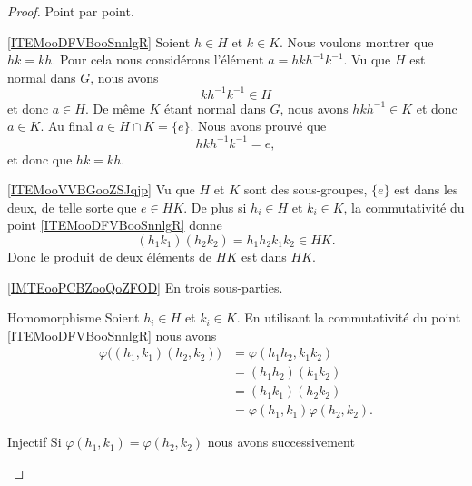 \begin{proof}
    Point par point.
    \begin{subproof}
    \item[\ref{ITEMooDFVBooSnnlgR}]
        Soient \( h\in H\) et \( k\in K\). Nous voulons montrer que \( hk=kh\). Pour cela nous considérons l'élément \( a=hkh^{-1}k^{-1}\). Vu que \( H \) est normal dans \( G\), nous avons 
        \begin{equation}
            kh^{-1}k^{-1}\in H
        \end{equation}
        et donc \( a\in H\). De même \( K\) étant normal dans \( G\), nous avons \( hkh^{-1}\in K\) et donc \( a\in K\). Au final \( a\in H\cap K=\{ e \}\). Nous avons prouvé que
        \begin{equation}
            hkh^{-1}k^{-1}=e,
        \end{equation}
        et donc que \( hk=kh\).
    \item[\ref{ITEMooVVBGooZSJqjp}]
        Vu que \( H\) et \( K\) sont des sous-groupes, \( \{ e \}\) est dans les deux, de telle sorte que \( e\in HK\). De plus si \( h_i\in H\) et \( k_i\in K\), la commutativité du point \ref{ITEMooDFVBooSnnlgR} donne
        \begin{equation}
            (h_1k_1)(h_2k_2)=h_1h_2k_1k_2\in HK.
        \end{equation}
        Donc le produit de deux éléments de \( HK\) est dans $HK$.
    \item[\ref{IMTEooPCBZooQoZFOD}]
        En trois sous-parties.
        \begin{subproof}
        \item[Homomorphisme]
            Soient \( h_i\in H\) et \( k_i\in K\). En utilisant la commutativité du point \ref{ITEMooDFVBooSnnlgR} nous avons
            \begin{subequations}
                \begin{align}
                    \varphi\big( (h_1,k_1)(h_2,k_2) \big)&=\varphi(h_1h_2,k_1k_2)\\
                    &=(h_1h_2)(k_1k_2)\\
                    &=(h_1k_1)(h_2k_2)\\
                    &=\varphi(h_1,k_1)\varphi(h_2,k_2).
                \end{align}
            \end{subequations}
        \item[Injectif]
            Si \( \varphi(h_1,k_1)=\varphi(h_2,k_2)\) nous avons successivement

\end{subproof}
\end{subproof}
\end{proof}
